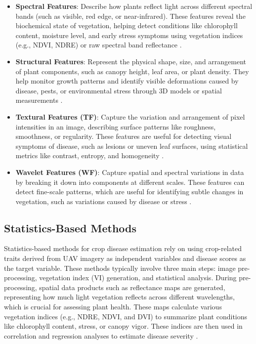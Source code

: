 \begin{itemize}
    \item \textbf{Spectral Features}: Describe how plants reflect light across different spectral bands (such as visible, red edge, or near-infrared). These features reveal the biochemical state of vegetation, helping detect conditions like chlorophyll content, moisture level, and early stress symptoms using vegetation indices (e.g., NDVI, NDRE) or raw spectral band reflectance \parencite{Dhakal2023spectral}.
    
    \item \textbf{Structural Features}: Represent the physical shape, size, and arrangement of plant components, such as canopy height, leaf area, or plant density. They help monitor growth patterns and identify visible deformations caused by disease, pests, or environmental stress through 3D models or spatial measurements \parencite{Dhakal2023spectral}.
    
    \item \textbf{Textural Features (TF)}: Capture the variation and arrangement of pixel intensities in an image, describing surface patterns like roughness, smoothness, or regularity. These features are useful for detecting visual symptoms of disease, such as lesions or uneven leaf surfaces, using statistical metrics like contrast, entropy, and homogeneity \parencite{Dhakal2023spectral}.
    
    \item \textbf{Wavelet Features (WF)}: Capture spatial and spectral variations in data by breaking it down into components at different scales. These features can detect fine-scale patterns, which are useful for identifying subtle changes in vegetation, such as variations caused by disease or stress \parencite{Ma2021FusariumUAV}.
 
\end{itemize}
  

\subsection{Statistics-Based Methods}
Statistics-based methods for crop disease estimation rely on using crop-related traits derived from UAV imagery as independent variables and disease scores as the target variable. These methods typically involve three main steps: image pre-processing, vegetation index (VI) generation, and statistical analysis. During pre-processing, spatial data products such as reflectance maps are generated, representing how much light vegetation reflects across different wavelengths, which is crucial for assessing plant health. These maps calculate various vegetation indices (e.g., NDRE, NDVI, and DVI) to summarize plant conditions like chlorophyll content, stress, or canopy vigor. These indices are then used in correlation and regression analyses to estimate disease severity \parencite{shahi2023recent}.

